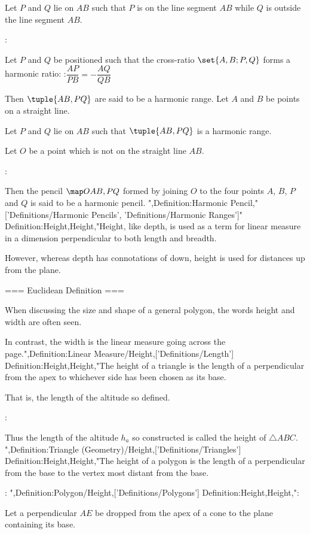 Let $P$ and $Q$ lie on $AB$ such that $P$ is on the line segment $AB$ while $Q$ is outside the line segment $AB$.


:


Let $P$ and $Q$ be positioned such that the cross-ratio $\set {A, B; P, Q}$ forms a harmonic ratio:
:$\dfrac {AP} {PB} = -\dfrac {AQ} {QB}$


Then $\tuple {AB, PQ}$ are said to be a harmonic range.
Let $A$ and $B$ be points on a straight line.

Let $P$ and $Q$ lie on $AB$ such that $\tuple {AB, PQ}$ is a harmonic range.


Let $O$ be a point which is not on the straight line $AB$.


:


Then the pencil $\map O {AB, PQ}$ formed by joining $O$ to the four points $A$, $B$, $P$ and $Q$ is said to be a harmonic pencil.
",Definition:Harmonic Pencil,"['Definitions/Harmonic Pencils', 'Definitions/Harmonic Ranges']"
Definition:Height,Height,"Height, like depth, is used as a term for linear measure in a dimension perpendicular to both length and breadth.


However, whereas depth has connotations of down, height is used for distances up from the plane.


=== Euclidean Definition ===

When discussing the size and shape of a general polygon, the words height and width are often seen.



In contrast, the width is the linear measure going across the page.",Definition:Linear Measure/Height,['Definitions/Length']
Definition:Height,Height,"The height of a triangle is the length of a perpendicular from the apex to whichever side has been chosen as its base.


That is, the length of the altitude so defined.


:

Thus the length of the altitude $h_a$ so constructed is called the height of $\triangle ABC$.
",Definition:Triangle (Geometry)/Height,['Definitions/Triangles']
Definition:Height,Height,"The height of a polygon is the length of a perpendicular from the base to the vertex most distant from the base.



:
",Definition:Polygon/Height,['Definitions/Polygons']
Definition:Height,Height,":

Let a perpendicular $AE$ be dropped from the apex of a cone to the plane containing its base.

